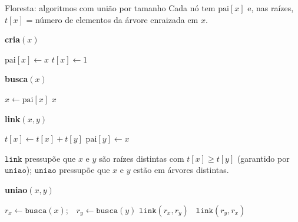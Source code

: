 \documentclass[aspectratio=169,10pt]{beamer}
\newcommand{\Busca}{\mathtt{busca}}
\newcommand{\Uniao}{\mathtt{uniao}}
\newcommand{\Link}{\mathtt{link}}
\begin{document}
\begin{frame}[t]{Floresta: algoritmos com união por tamanho}
  \footnotesize
  Cada nó tem $\mathrm{pai}[x]$ e, nas raízes, $t[x]$ = número de
  elementos da árvore enraizada em $x$.

  \medskip
  \begin{minipage}[t]{.3\linewidth}
    \textbf{cria$(x)$}
    \begin{algorithmic}[1]
      \State $\mathrm{pai}[x]\gets x$
      \State $t[x]\gets1$
    \end{algorithmic}
  \end{minipage}
  \hfill
  \begin{minipage}[t]{.33\linewidth}
    \textbf{busca$(x)$}
    \begin{algorithmic}[1]
      \State $x\gets\mathrm{pai}[x]$
      \EndWhile
      \State \Return $x$
    \end{algorithmic}
  \end{minipage}
  \hfill
  \begin{minipage}[t]{.3\linewidth}
    \textbf{link$(x,y)$}
    \begin{algorithmic}[1]
      \State $t[x]\gets t[x]+t[y]$
      \State $\mathrm{pai}[y]\gets x$
    \end{algorithmic}
  \end{minipage}

  \medskip
  $\Link$ pressupõe que $x$ e $y$ são raízes distintas com
  $t[x]\geq t[y]$ (garantido por $\Uniao$); $\Uniao$ pressupõe que $x$ e
  $y$ estão em árvores distintas.

  \medskip
  \textbf{uniao$(x,y)$}
  \begin{algorithmic}[1]
    \State $r_x\gets\Busca(x)$;\ \ $r_y\gets\Busca(y)$
     \State $\Link(r_x,r_y)$
    \Else\ \State $\Link(r_y,r_x)$
    \EndIf
  \end{algorithmic}
\end{frame}
\end{document}
